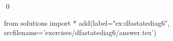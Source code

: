 
\begin{ex} 
  \label{ex:dfastatediag6}
  
  \qed
\end{ex} 
\begin{python0}
from solutions import *
add(label="ex:dfastatediag6",
    srcfilename='exercises/dfastatediag6/answer.tex') 
\end{python0}
